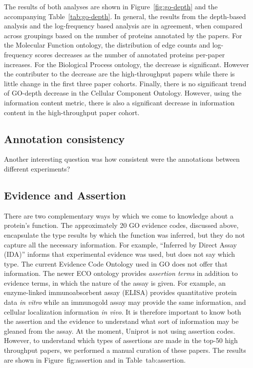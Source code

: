 \documentclass[10pt]{article}
\begin{document}
The results of both analyses are shown in Figure~\ref{fig:go-depth} and the accompanying
Table~\ref{tab:go-depth}. In general, the results from the depth-based analysis and the
log-frequency based analysis are in agreement, when compared across groupings based on the
number of proteins annotated by the papers. For the Molecular Function ontology, the
distribution of edge counts and log-frequency scores decreases as the number of annotated
proteins per-paper increases.  For the Biological Process ontology, the decrease is
significant. However the contributer to the decrease are the high-throughput papers
while there is little change in the first three paper cohorts.
Finally, there is no significant trend of GO-depth decrease in the Cellular Component
Ontology. However, using the information content metric, there is also a significant decrease
in information content in the high-throughput paper cohort.

\subsection*{Annotation consistency}
Another interesting question was how consistent were the annotations between different experiments?


\subsection*{Evidence and Assertion}

There are two complementary ways by which we come to knowledge about a protein's function. The approximately 20 GO
evidence codes, discussed above, encapsulate the type results by which the function was inferred, but they do not
capture all the necessary information. For example, ``Inferred by Direct Assay (IDA)'' informs that experimental
evidence was used, but does not say which type. The current Evidence Code Ontology used in GO does not offer that
information.  The newer ECO ontology provides \textit{assertion terms} in addition to evidence terms, in which the
nature of the assay is given. For example, an enzyme-linked immunoabsorbent assay (ELISA) provides quantitative
protein data \textit{in vitro} while an immunogold assay may provide the same information, and cellular
localization information \textit{in vivo}. It is therefore important to know both the assertion and the evidence to
understand what sort of information may be gleaned from the assay. At the moment, Uniprot is not using assertion
codes. However, to understand which types of assertions are made in the top-50 high throughput papers, we performed
a manual curation of these papers. The results are shown in Figure~{fig:assertion} and in Table~{tab:assertion}.
\end{document}
